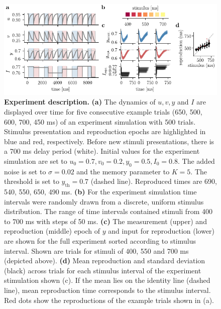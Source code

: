 \documentclass[10pt]{article}
\begin{document}
\begin{figure}[ht]
	\centering
	\includegraphics{figures/trial.pdf}
	\caption{\textbf{Experiment description.} 
	\textbf{(a)} The dynamics of $u, v, y $ and $I$ are displayed over time for five consecutive example trials (650, 500, 600, 700, 450 ms) of an experiment simulation with 500 trials. Stimulus presentation and reproduction epochs are highlighted in blue and red, respectively. Before new stimuli presentations, there is a 700 ms delay period (white). Initial values for the experiment simulation are set to $u_0=0.7 , v_0=0.2 , y_0=0.5, I_0=0.8$. The added noise is set to $\sigma=0.02$ and the memory parameter to $K=5$. The threshold is set to $y_{\text{th}}=0.7$ (dashed line). Reproduced times are 690, 540, 550, 650, 490 ms.
	\textbf{(b)} For the experiment simulation time intervals were randomly drawn from a discrete, uniform stimulus distribution. The range of time intervals contained stimuli from 400 to 700 ms with steps of 50 ms.
	\textbf{(c)} The measurement (upper) and reproduction (middle) epoch of $y$ and input for reproduction (lower) are shown for the full experiment sorted according to stimulus interval. Shown are trials for stimuli of 400, 550 and 700 ms (depicted above).
	\textbf{(d)} Mean reproduction and standard deviation (black) across trials for each stimulus interval of the experiment stimulation shown (c). If the mean lies on the identity line (dashed line), mean reproduction time corresponds to the stimulus interval. Red dots show the reproductions of the example trials shown in (a). 
	}
\label{fig:experiment}
\end{figure}
\end{document}
